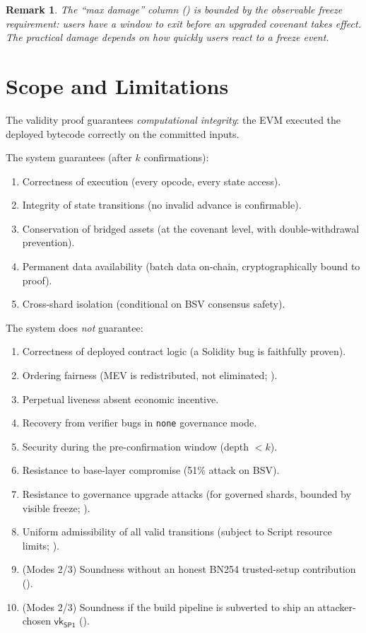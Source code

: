 \documentclass[11pt,a4paper]{article}
\newtheorem{remark}{Remark}[section]
\newcommand{\SPone}{\mathsf{SP1}}
\newcommand{\vkSP}{\mathsf{vk}_{\SPone}}           %
\begin{document}
\begin{remark}
The ``max damage'' column () is bounded by the observable freeze requirement: users have a window to exit before an upgraded covenant takes effect. The practical damage depends on how quickly users react to a freeze event.
\end{remark}


\section{Scope and Limitations}\label{sec:scope}

The validity proof guarantees \emph{computational integrity}: the EVM executed the deployed bytecode correctly on the committed inputs.

The system guarantees (after $k$ confirmations):
\begin{enumerate}[nosep]
    \item Correctness of execution (every opcode, every state access).
    \item Integrity of state transitions (no invalid advance is confirmable).
    \item Conservation of bridged assets (at the covenant level, with double-withdrawal prevention).
    \item Permanent data availability (batch data on-chain, cryptographically bound to proof).
    \item Cross-shard isolation (conditional on BSV consensus safety).
\end{enumerate}

The system does \emph{not} guarantee:
\begin{enumerate}[nosep]
    \item Correctness of deployed contract logic (a Solidity bug is faithfully proven).
    \item Ordering fairness (MEV is redistributed, not eliminated; ).
    \item Perpetual liveness absent economic incentive.
    \item Recovery from verifier bugs in \texttt{none} governance mode.
    \item Security during the pre-confirmation window (depth $< k$).
    \item Resistance to base-layer compromise (51\% attack on BSV).
    \item Resistance to governance upgrade attacks (for governed shards, bounded by visible freeze; ).
    \item Uniform admissibility of all valid transitions (subject to Script resource limits; ).
    \item (Modes 2/3) Soundness without an honest BN254 trusted-setup contribution ().
    \item (Modes 2/3) Soundness if the build pipeline is subverted to ship an attacker-chosen $\vkSP$ ().
\end{enumerate}
\end{document}
